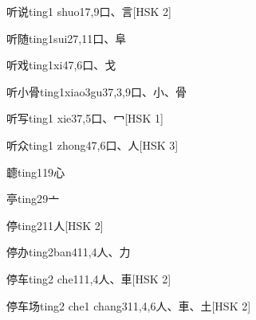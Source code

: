 \begin{entry}{听说}{ting1 shuo1}{7,9}{⼝、⾔}[HSK 2]
\end{entry}

\begin{entry}{听随}{ting1sui2}{7,11}{⼝、⾩}
\end{entry}

\begin{entry}{听戏}{ting1xi4}{7,6}{⼝、⼽}
\end{entry}

\begin{entry}{听小骨}{ting1xiao3gu3}{7,3,9}{⼝、⼩、⾻}
\end{entry}

\begin{entry}{听写}{ting1 xie3}{7,5}{⼝、⼍}[HSK 1]
\end{entry}

\begin{entry}{听众}{ting1 zhong4}{7,6}{⼝、⼈}[HSK 3]
\end{entry}

\begin{entry}{聼}{ting1}{19}{⼼}
\end{entry}

\begin{entry}{亭}{ting2}{9}{⼇}
\end{entry}

\begin{entry}{停}{ting2}{11}{⼈}[HSK 2]
\end{entry}

\begin{entry}{停办}{ting2ban4}{11,4}{⼈、⼒}
\end{entry}

\begin{entry}{停车}{ting2 che1}{11,4}{⼈、⾞}[HSK 2]
\end{entry}

\begin{entry}{停车场}{ting2 che1 chang3}{11,4,6}{⼈、⾞、⼟}[HSK 2]
\end{entry}


